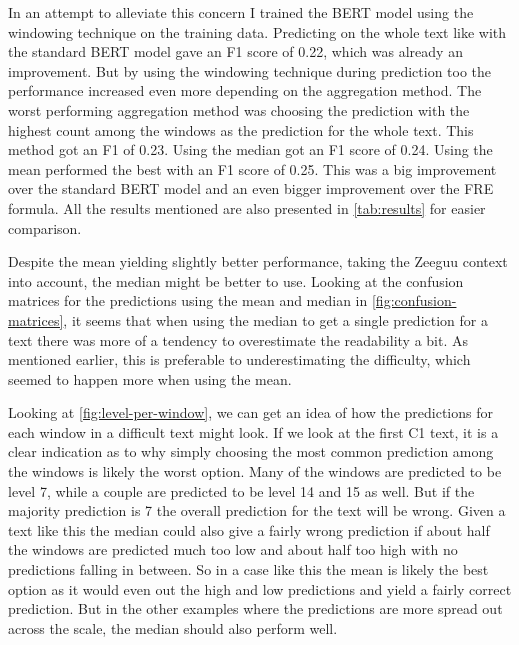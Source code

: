 \documentclass[11pt,a4paper]{article}
\begin{document}
In an attempt to alleviate this concern I trained the BERT model using the
windowing technique on the training data. Predicting on the whole text like
with the standard BERT model gave an F1 score of 0.22, which was already an
improvement. But by using the windowing technique during prediction too the
performance increased even more depending on the aggregation method. The worst
performing aggregation method was choosing the prediction with the highest
count among the windows as the prediction for the whole text. This method got
an F1 of 0.23. Using the median got an F1 score of 0.24.
Using the mean performed the best with an F1 score of 0.25. This
was a big improvement over the standard BERT model and an even bigger
improvement over the FRE formula. All the results mentioned are also presented
in \autoref{tab:results} for easier comparison.

Despite the mean yielding slightly better performance, taking the Zeeguu
context into account, the median might be better to use. Looking at the
confusion matrices for the predictions using the mean and median in
\autoref{fig:confusion-matrices}, it seems that when using the median to
get a single prediction for a text there was more of a tendency to overestimate
the readability a bit. As mentioned earlier, this is preferable to
underestimating the difficulty, which seemed to happen more when
using the mean.

Looking at \autoref{fig:level-per-window}, we can get an idea of how the
predictions for each window in a difficult text might look. If we look at the
first C1 text, it is a clear indication as to why simply choosing the most
common prediction among the windows is likely the worst option. Many of the
windows are predicted to be level 7, while a couple are predicted to be level 14
and 15 as well. But if the majority prediction is 7 the overall prediction for
the text will be wrong. Given a text like this the median could also give a
fairly wrong prediction if about half the windows are predicted much too low
and about half too high with no predictions falling in between. So in a case
like this the mean is likely the best option as it would even out the high and
low predictions and yield a fairly correct prediction. But in the other
examples where the predictions are more spread out across the scale, the median
should also perform well.
\end{document}

